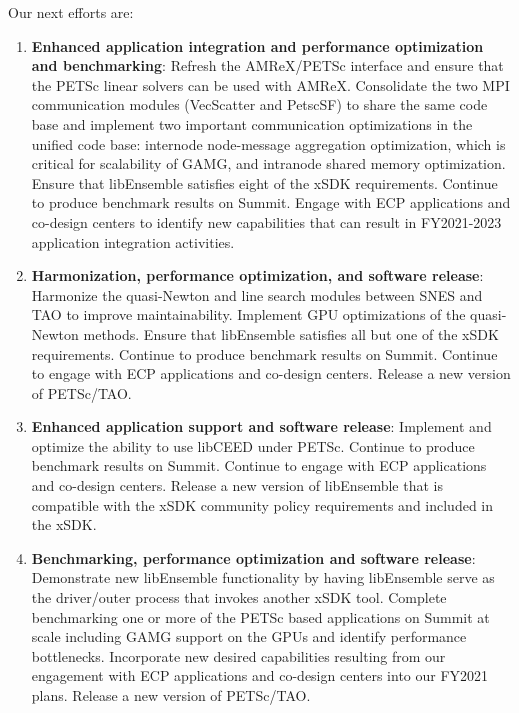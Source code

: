 Our next efforts are:
\begin{enumerate}
  \item \textbf{Enhanced application integration and performance optimization and benchmarking}:
  Refresh the AMReX/PETSc interface and ensure that the PETSc linear solvers can be used with AMReX.
  Consolidate the two MPI communication modules (VecScatter and PetscSF) to share the same code base 
  and implement two important communication optimizations in the unified code base: internode node-message 
  aggregation optimization, which is critical for scalability of GAMG, and intranode shared memory 
  optimization.  
  Ensure that libEnsemble satisfies eight of the xSDK requirements.
  Continue to produce benchmark results on Summit.
  Engage with ECP applications and co-design centers to identify new capabilities that can result in 
  FY2021-2023 application integration activities.
  \item \textbf{Harmonization, performance optimization, and software release}:
  Harmonize the quasi-Newton and line search modules between SNES and TAO to improve maintainability.
  Implement GPU optimizations of the quasi-Newton methods.
  Ensure that libEnsemble satisfies all but one of the xSDK requirements.
  Continue to produce benchmark results on Summit.
  Continue to engage with ECP applications and co-design centers.
  Release a new version of PETSc/TAO.
  \item \textbf{Enhanced application support and software release}:
  Implement and optimize the ability to use libCEED under PETSc.
  Continue to produce benchmark results on Summit.
  Continue to engage with ECP applications and co-design centers.
  Release a new version of libEnsemble that is compatible with the xSDK community policy requirements and included in the xSDK.
  \item \textbf{Benchmarking, performance optimization and software release}:
  Demonstrate new libEnsemble functionality by having libEnsemble serve as the driver/outer process that 
  invokes another xSDK tool.
  Complete benchmarking one or more of the PETSc based applications on Summit at scale including GAMG support 
  on the GPUs and identify performance bottlenecks.
  Incorporate new desired capabilities resulting from our engagement with ECP applications and co-design centers into our FY2021 plans.
  Release a new version of PETSc/TAO.
\end{enumerate}

